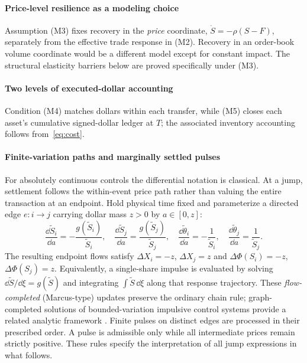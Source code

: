 \documentclass[review,hidelinks,onefignum,onetabnum]{siamonline250211}
\begin{document}
\paragraph{Price-level resilience as a modeling choice}
Assumption (M3) fixes recovery in the \emph{price} coordinate,
$\dot S=-\rho(S-F)$, separately from the effective trade response in (M2).
Recovery in an order-book volume coordinate would be a different model except for constant impact. The structural elasticity barriers below are proved specifically under (M3).

\paragraph{Two levels of executed-dollar accounting}
Condition (M4) matches dollars within each transfer, while
(M5) closes each asset's cumulative signed-dollar ledger
at $T$; the associated inventory accounting follows from~\eqref{eq:cost}.

\paragraph{Finite-variation paths and marginally settled pulses}
For absolutely continuous controls the differential notation is classical. At a jump, settlement follows the within-event price path rather than valuing the entire transaction at an endpoint. Hold physical time fixed and parameterize a directed edge $e:i\to j$ carrying dollar mass $z>0$ by $a\in[0,z]$:
\begin{equation}\label{eq:pulse-flow}
\frac{\dd \widetilde S_i}{\dd a}=-\frac{g(\widetilde S_i)}{\widetilde S_i},\quad
\frac{\dd \widetilde S_j}{\dd a}=\frac{g(\widetilde S_j)}{\widetilde S_j},\quad
\frac{\dd\widetilde\theta_i}{\dd a}=-\frac{1}{\widetilde S_i},\quad
\frac{\dd\widetilde\theta_j}{\dd a}=\frac{1}{\widetilde S_j}.
\end{equation}
The resulting endpoint flows satisfy $\Delta X_i=-z$, $\Delta X_j=z$ and $\Delta\Phi(S_i)=-z$, $\Delta\Phi(S_j)=z$. Equivalently, a single-share impulse is evaluated by solving $\dd\widetilde S/\dd\xi=g(\widetilde S)$ and integrating $\int\widetilde S\,\dd\xi$ along that response trajectory. These \emph{flow-completed} (Marcus-type) updates preserve the ordinary chain rule; graph-completed solutions of bounded-variation impulsive control systems provide a related analytic framework \citep{BressanRampazzo1988}. Finite pulses on distinct edges are processed in their prescribed order. A pulse is admissible only while all intermediate prices remain strictly positive. These rules specify the interpretation of all jump expressions in what follows.
\end{document}
